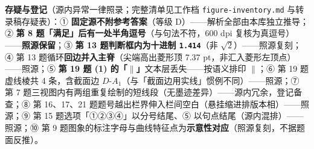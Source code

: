 \begin{gktip}
\textbf{存疑与登记}（源内异常一律照录；完整清单见工作档 \texttt{figure-inventory.md} 与转录稿存疑表）：① \textbf{固定源不附参考答案}（等级 D）——解析全部由本库独立推导；② \textbf{第 8 题「满足」后有一处半角逗号}（与句法不符，600 dpi 复核为真逗号）——\textbf{照源保留}；③ \textbf{第 13 题判断框内为十进制 \texttt{1.414}}（非 \(\sqrt{2}\)）——照源复刻；④ 第 13 题循环\textbf{回边并入主脊}（尖端高出菱形顶 7.37 pt，非汇入菱形左顶点）——照源；⑤ \textbf{第 19 题 (1) 的「$\parallel$」}文本层丢失——按语义排印 \(\parallel\)；⑥ 第 19 题虚线棱共 4 条，含截面边 \(D\text{-}A_1\)（与「截面边用实线」惯例不同）——照源；⑦ 第 7 题三视图内有两组重复绘制的短线段（无墨迹差异）——源内冗余，登记备查；⑧ 第 16、17、21 题题号越出栏界伸入栏间空白（悬挂缩进排版本相）——照源；⑨ 第 15 题选项「①②③④」以分号结尾、⑤ 以句点结尾（源内混排）——照源；⑩ 第 9 题图象的标注字母与曲线特征点为\textbf{示意性对应}（照源复刻，不据题面反推）。
\end{gktip}



